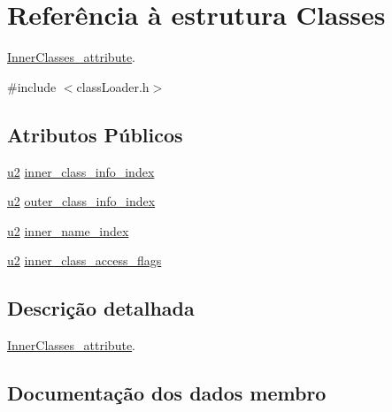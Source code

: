 \hypertarget{struct_classes}{}\section{Referência à estrutura Classes}
\label{struct_classes}


\hyperlink{struct_inner_classes__attribute}{Inner\+Classes\+\_\+attribute}.  




{\ttfamily \#include $<$class\+Loader.\+h$>$}

\subsection*{Atributos Públicos}
\begin{DoxyCompactItemize}
\item 
\hyperlink{util_8h_a55ef8d87fd202b8417704c089899c5b9}{u2} \hyperlink{struct_classes_a81deba58ea3d27176396999857216eba}{inner\+\_\+class\+\_\+info\+\_\+index}
\item 
\hyperlink{util_8h_a55ef8d87fd202b8417704c089899c5b9}{u2} \hyperlink{struct_classes_a7437bc55eb998ea0d4eec7b8ebda32c5}{outer\+\_\+class\+\_\+info\+\_\+index}
\item 
\hyperlink{util_8h_a55ef8d87fd202b8417704c089899c5b9}{u2} \hyperlink{struct_classes_ae675c3ce50aa5f7714c632aef5b004b9}{inner\+\_\+name\+\_\+index}
\item 
\hyperlink{util_8h_a55ef8d87fd202b8417704c089899c5b9}{u2} \hyperlink{struct_classes_ad90d20687902aa92ca1c6fa8f03b0302}{inner\+\_\+class\+\_\+access\+\_\+flags}
\end{DoxyCompactItemize}


\subsection{Descrição detalhada}
\hyperlink{struct_inner_classes__attribute}{Inner\+Classes\+\_\+attribute}. 

\subsection{Documentação dos dados membro}
\mbox{\label{struct_classes_ad90d20687902aa92ca1c6fa8f03b0302}} 
